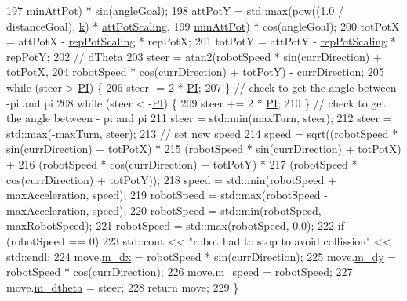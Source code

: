 \begin{DoxyCode}
197                      \hyperlink{classRobotPlanner_a199d479764e8e96c37654486ddc1ef7d}{minAttPot}) * sin(angleGoal);
198   attPotY = std::max(pow((1.0 / distanceGoal), \hyperlink{classRobotPlanner_a18ebcf4ba23a817db1a2fda878120eb4}{k}) * \hyperlink{classRobotPlanner_aa68f0bb24256b470a8a4d13d858aef7f}{attPotScaling},
199                      \hyperlink{classRobotPlanner_a199d479764e8e96c37654486ddc1ef7d}{minAttPot}) * cos(angleGoal);
200   totPotX = attPotX - \hyperlink{classRobotPlanner_a0b056d74826bddeb6dbd5a458aad0758}{repPotScaling} * repPotX;
201   totPotY = attPotY - \hyperlink{classRobotPlanner_a0b056d74826bddeb6dbd5a458aad0758}{repPotScaling} * repPotY;
202   \textcolor{comment}{//  dTheta}
203   steer = atan2(robotSpeed * sin(currDirection) + totPotX,
204                 robotSpeed * cos(currDirection) + totPotY) - currDirection;
205   \textcolor{keywordflow}{while} (steer > \hyperlink{Actor_8hpp_a598a3330b3c21701223ee0ca14316eca}{PI}) \{
206     steer -= 2 * \hyperlink{Actor_8hpp_a598a3330b3c21701223ee0ca14316eca}{PI};
207   \}  \textcolor{comment}{//  check to get the angle between -pi and pi}
208   \textcolor{keywordflow}{while} (steer < -\hyperlink{Actor_8hpp_a598a3330b3c21701223ee0ca14316eca}{PI}) \{
209     steer += 2 * \hyperlink{Actor_8hpp_a598a3330b3c21701223ee0ca14316eca}{PI};
210   \}  \textcolor{comment}{//  check to get the angle between - pi and pi}
211   steer = std::min(maxTurn, steer);
212   steer = std::max(-maxTurn, steer);
213 \textcolor{comment}{//  set new speed}
214   speed = sqrt((robotSpeed * sin(currDirection) + totPotX) *
215                (robotSpeed * sin(currDirection) + totPotX) +
216                (robotSpeed * cos(currDirection) + totPotY) *
217                (robotSpeed * cos(currDirection) + totPotY));
218   speed = std::min(robotSpeed + maxAcceleration, speed);
219   robotSpeed = std::max(robotSpeed - maxAcceleration, speed);
220   robotSpeed = std::min(robotSpeed, maxRobotSpeed);
221   robotSpeed = std::max(robotSpeed, 0.0);
222   \textcolor{keywordflow}{if} (robotSpeed == 0)
223     std::cout << \textcolor{stringliteral}{"robot had to stop to avoid collission"} << std::endl;
224   move.\hyperlink{structRobotMove_aeb93adca1b150538c56a548fb3a060f7}{m\_dx} = robotSpeed * sin(currDirection);
225   move.\hyperlink{structRobotMove_a8da71ddc10ffe34d3cc0f9d0cb26e33c}{m\_dy} = robotSpeed * cos(currDirection);
226   move.\hyperlink{structRobotMove_a9b6595c240cc17c54b4436c592c5c6b9}{m\_speed} = robotSpeed;
227   move.\hyperlink{structRobotMove_a667d60a557ec5177f77cd0bcf98ba84b}{m\_dtheta} = steer;
228   \textcolor{keywordflow}{return} move;
229 \}
\end{DoxyCode}


